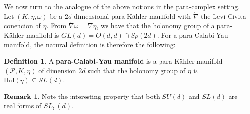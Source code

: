 \documentclass[letterpaper,12pt]{article}
\newcommand{\lc}{\mathring{\n}}
\newcommand{\PS}{\mathcal{P}}
\def\w{\wedge}
\newcommand{\p}{\partial}
\newcommand{\n}{\nabla}
\theoremstyle{definition}
\newtheorem{Def}[theorem]{Definition}
\newtheorem{remark}[theorem]{Remark}
\theoremstyle{remark}
\theoremstyle{examples}
\begin{document}


We now turn to the analogue of the above notions in the para-complex setting. Let $(K,\eta,\omega)$ be a $2d$-dimensional para-K\"ahler manifold with $\lc$ the Levi-Civita conencion of $\eta$. From $\lc\omega=\lc\eta$, we have that the holonomy group of a para-K\"ahler manifold is $GL(d)=O(d,d)\cap Sp(2d)$. For a para-Calabi-Yau manifold, the natural definition is therefore the following:

\begin{Def}
A {\bf para-Calabi-Yau manifold} is a para-K\"ahler manifold $(\PS,K,\eta)$ of dimension $2d$ such that the holonomy group of $\eta$ is $\text{Hol}(\eta)\subseteq SL(d)$.
\end{Def}
\begin{remark}
Note the interesting property that both $SU(d)$ and $SL(d)$ are real forms of $SL_\mathbb{C}(d)$.
\end{remark}
\end{document}
